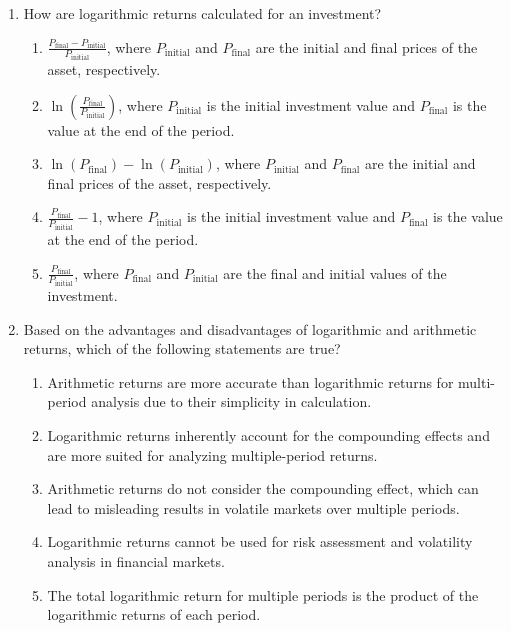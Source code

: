 \documentclass{article}
\begin{document}
\begin{enumerate}
    \item How are logarithmic returns calculated for an investment?
    \begin{enumerate}
        \item \(\frac{P_{\text{final}} - P_{\text{initial}}}{P_{\text{initial}}}\), where \(P_{\text{initial}}\) and \(P_{\text{final}}\) are the initial and final prices of the asset, respectively.
        \item \(\ln(\frac{P_{\text{final}}}{P_{\text{initial}}})\), where \(P_{\text{initial}}\) is the initial investment value and \(P_{\text{final}}\) is the value at the end of the period.
        \item \(\ln(P_{\text{final}}) - \ln(P_{\text{initial}})\), where \(P_{\text{initial}}\) and \(P_{\text{final}}\) are the initial and final prices of the asset, respectively.
        \item \(\frac{P_{\text{final}}}{P_{\text{initial}}} - 1\), where \(P_{\text{initial}}\) is the initial investment value and \(P_{\text{final}}\) is the value at the end of the period.
        \item \(\frac{P_{\text{final}}}{P_{\text{initial}}}\), where \(P_{\text{final}}\) and \(P_{\text{initial}}\) are the final and initial values of the investment.
    \end{enumerate}

    \item Based on the advantages and disadvantages of logarithmic and arithmetic returns, which of the following statements are true?
    \begin{enumerate}
        \item Arithmetic returns are more accurate than logarithmic returns for multi-period analysis due to their simplicity in calculation.
        \item Logarithmic returns inherently account for the compounding effects and are more suited for analyzing multiple-period returns.
        \item Arithmetic returns do not consider the compounding effect, which can lead to misleading results in volatile markets over multiple periods.
        \item Logarithmic returns cannot be used for risk assessment and volatility analysis in financial markets.
        \item The total logarithmic return for multiple periods is the product of the logarithmic returns of each period.
    \end{enumerate}


\end{enumerate}
\end{document}
